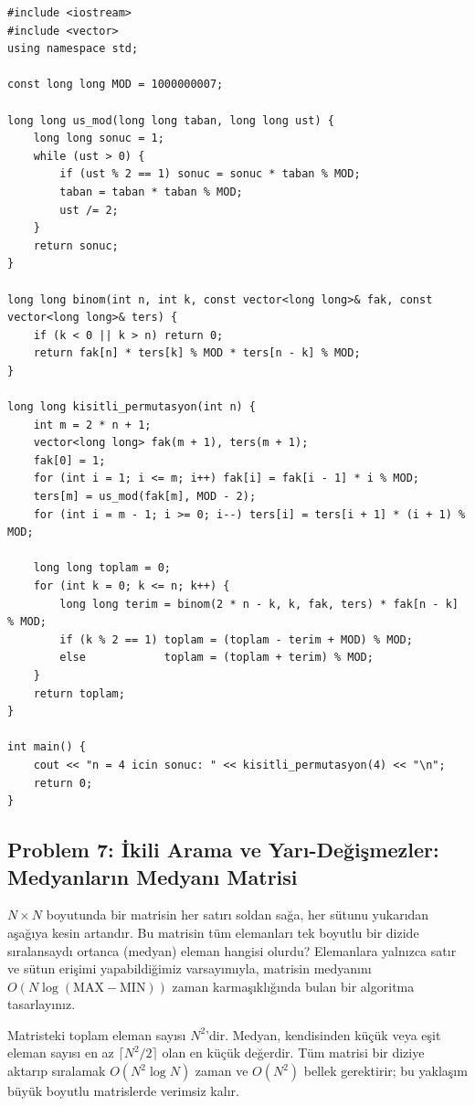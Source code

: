 \begin{lstlisting}[language=CppTemel]
#include <iostream>
#include <vector>
using namespace std;

const long long MOD = 1000000007;

long long us_mod(long long taban, long long ust) {
    long long sonuc = 1;
    while (ust > 0) {
        if (ust % 2 == 1) sonuc = sonuc * taban % MOD;
        taban = taban * taban % MOD;
        ust /= 2;
    }
    return sonuc;
}

long long binom(int n, int k, const vector<long long>& fak, const vector<long long>& ters) {
    if (k < 0 || k > n) return 0;
    return fak[n] * ters[k] % MOD * ters[n - k] % MOD;
}

long long kisitli_permutasyon(int n) {
    int m = 2 * n + 1;
    vector<long long> fak(m + 1), ters(m + 1);
    fak[0] = 1;
    for (int i = 1; i <= m; i++) fak[i] = fak[i - 1] * i % MOD;
    ters[m] = us_mod(fak[m], MOD - 2);
    for (int i = m - 1; i >= 0; i--) ters[i] = ters[i + 1] * (i + 1) % MOD;

    long long toplam = 0;
    for (int k = 0; k <= n; k++) {
        long long terim = binom(2 * n - k, k, fak, ters) * fak[n - k] % MOD;
        if (k % 2 == 1) toplam = (toplam - terim + MOD) % MOD;
        else            toplam = (toplam + terim) % MOD;
    }
    return toplam;
}

int main() {
    cout << "n = 4 icin sonuc: " << kisitli_permutasyon(4) << "\n";
    return 0;
}\end{lstlisting}

\subsection{Problem 7: İkili Arama ve Yarı-Değişmezler: Medyanların Medyanı Matrisi}

\begin{example}
$N \times N$ boyutunda bir matrisin her satırı soldan sağa, her sütunu yukarıdan aşağıya kesin artandır.
Bu matrisin tüm elemanları tek boyutlu bir dizide sıralansaydı ortanca (medyan) eleman hangisi olurdu?
Elemanlara yalnızca satır ve sütun erişimi yapabildiğimiz varsayımıyla, matrisin medyanını $O(N \log(\text{MAX} - \text{MIN}))$ zaman karmaşıklığında bulan bir algoritma tasarlayınız.
\end{example}

Matristeki toplam eleman sayısı $N^2$'dir. Medyan, kendisinden küçük veya eşit eleman sayısı en az $\lceil N^2 / 2 \rceil$ olan en küçük değerdir.
Tüm matrisi bir diziye aktarıp sıralamak $O(N^2 \log N)$ zaman ve $O(N^2)$ bellek gerektirir; bu yaklaşım büyük boyutlu matrislerde verimsiz kalır.

